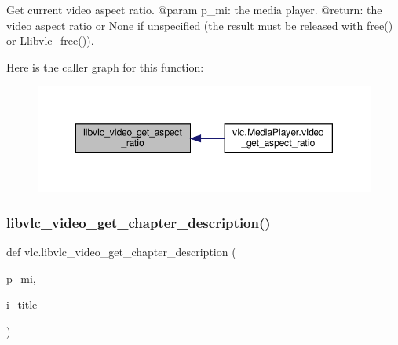 \begin{DoxyVerb}Get current video aspect ratio.
@param p_mi: the media player.
@return: the video aspect ratio or None if unspecified (the result must be released with free() or L{libvlc_free}()).
\end{DoxyVerb}
 Here is the caller graph for this function\+:
\nopagebreak
\begin{figure}[H]
\begin{center}
\leavevmode
\includegraphics[width=350pt]{namespacevlc_ae8a30662bf8336cac0e165ab5eac932a_icgraph}
\end{center}
\end{figure}
\mbox{\label{namespacevlc_a5104946a600f435d5bc0493607457ea5}} 
\subsubsection{\texorpdfstring{libvlc\+\_\+video\+\_\+get\+\_\+chapter\+\_\+description()}{libvlc\_video\_get\_chapter\_description()}}
{\footnotesize\ttfamily def vlc.\+libvlc\+\_\+video\+\_\+get\+\_\+chapter\+\_\+description (\begin{DoxyParamCaption}\item[{}]{p\+\_\+mi,  }\item[{}]{i\+\_\+title }\end{DoxyParamCaption})}

